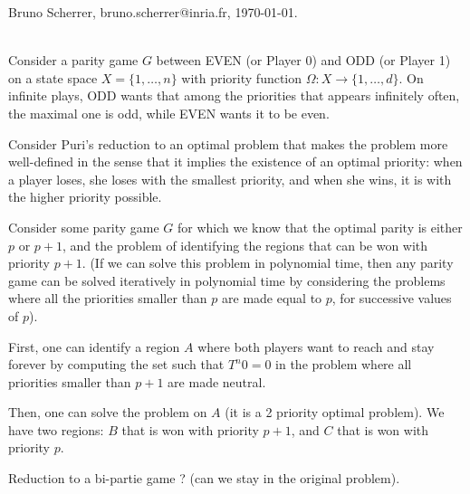 \documentclass{article}
\begin{document}
\noindent Bruno Scherrer, bruno.scherrer@inria.fr, \today.

~\\

Consider a parity game $G$ between EVEN (or Player 0) and ODD (or Player 1) on a state space $X=\{1,\dots,n\}$ with priority function $\Omega:X \to \{1,\dots,d\}$. On infinite plays, ODD wants that among the priorities that appears infinitely often, the maximal one is odd, while EVEN wants it to be even.

Consider Puri's reduction to an optimal problem that makes the problem more well-defined in the sense that it implies the existence of an optimal priority: when a player loses, she loses with the smallest priority, and when she wins, it is with the higher priority possible.

Consider some parity game $G$ for which we know that the optimal parity is either $p$ or $p+1$, and the problem of identifying the regions that can be won with priority $p+1$. (If we can solve this problem in polynomial time, then any parity game can be solved iteratively in polynomial time by considering the problems where all the priorities smaller than $p$ are made equal to $p$, for successive values of $p$).

First, one can identify a region $A$ where both players want to reach and stay forever by computing the set such that $T^n 0 = 0$ in the problem where all priorities smaller than $p+1$ are made neutral.

Then, one can solve the problem on $A$ (it is a 2 priority optimal problem).
We have two regions: $B$ that is won with priority $p+1$, and $C$ that is won with priority $p$.

Reduction to a bi-partie game ? (can we stay in the original problem).



 
\end{document}
